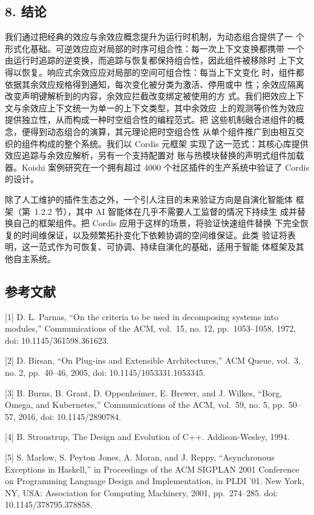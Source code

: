 \subsection{8. 结论}\label{conclusion}

我们通过把经典的效应与余效应概念提升为运行时机制，为动态组合提供了一
个形式化基础。可逆效应应对局部的时序可组合性：每一次上下文变换都携带
一个由运行时追踪的逆变换，而追踪与恢复都保持组合性，因此组件被移除时
上下文得以恢复。响应式余效应应对局部的空间可组合性：每当上下文变化
时，组件都依据其余效应规格得到通知，每次变化被分类为激活、停用或中
性；余效应隔离改变声明键解析到的内容，余效应拦截改变绑定被使用的方
式。我们把效应上下文与余效应上下文统一为单一的上下文类型，其中余效应
上的观测等价性为效应提供独立性，从而构成一种时空组合性的编程范式。把
这些机制融合进组件的概念，便得到动态组合的演算，其元理论把时空组合性
从单个组件推广到由相互交织的组件构成的整个系统。我们以 Cordis 元框架
实现了这一范式：其核心库提供效应追踪与余效应解析，另有一个支持配置对
账与热模块替换的声明式组件加载器。Koishi 案例研究在一个拥有超过 4000
个社区插件的生产系统中验证了 Cordis 的设计。

除了人工维护的插件生态之外，一个引人注目的未来验证方向是自演化智能体
框架（第~1.2.2 节），其中 AI 智能体在几乎不需要人工监督的情况下持续生
成并替换自己的框架组件。把 Cordis 应用于这样的场景，将验证快速组件替换
下完全恢复的时间维保证，以及频繁拓扑变化下依赖协调的空间维保证。此类
验证将表明，这一范式作为可恢复、可协调、持续自演化的基础，适用于智能
体框架及其他自主系统。

\subsection{参考文献}\label{references}

{[}1{]} D. L. Parnas, ``On the criteria to be used in decomposing systems into modules,''
Communications of the ACM, vol.~15, no. 12, pp.~1053--1058, 1972, doi:
10.1145/361598.361623.

{[}2{]} D. Birsan, ``On Plug-ins and Extensible Architectures,'' ACM Queue, vol.~3, no. 2,
pp.~40--46, 2005, doi: 10.1145/1053331.1053345.

{[}3{]} B. Burns, B. Grant, D. Oppenheimer, E. Brewer, and J. Wilkes, ``Borg, Omega,
and Kubernetes,'' Communications of the ACM, vol.~59, no. 5, pp.~50--57, 2016, doi:
10.1145/2890784.

{[}4{]} B. Stroustrup, The Design and Evolution of C++. Addison-Wesley, 1994.

{[}5{]} S. Marlow, S. Peyton Jones, A. Moran, and J. Reppy, ``Asynchronous Exceptions
in Haskell,'' in Proceedings of the ACM SIGPLAN 2001 Conference on Programming
Language Design and Implementation, in PLDI '01. New York, NY, USA: Association
for Computing Machinery, 2001, pp.~274--285. doi: 10.1145/378795.378858.

